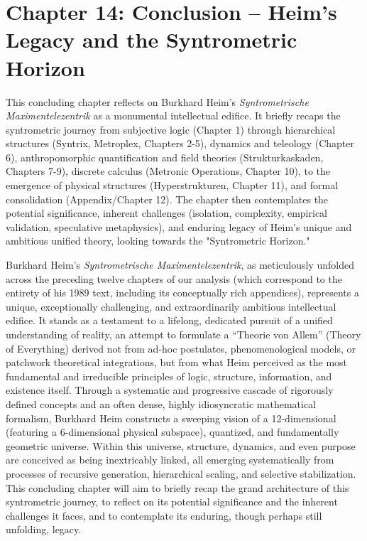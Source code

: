 \documentclass[12pt]{article}
\begin{document}
\section{Chapter 14: Conclusion – Heim’s Legacy and the Syntrometric Horizon}
\label{sec:conclusion}

This concluding chapter reflects on Burkhard Heim’s \textit{Syntrometrische Maximentelezentrik} as a monumental intellectual edifice. It briefly recaps the syntrometric journey from subjective logic (Chapter 1) through hierarchical structures (Syntrix, Metroplex, Chapters 2-5), dynamics and teleology (Chapter 6), anthropomorphic quantification and field theories (Strukturkaskaden, Chapters 7-9), discrete calculus (Metronic Operations, Chapter 10), to the emergence of physical structures (Hyperstrukturen, Chapter 11), and formal consolidation (Appendix/Chapter 12). The chapter then contemplates the potential significance, inherent challenges (isolation, complexity, empirical validation, speculative metaphysics), and enduring legacy of Heim's unique and ambitious unified theory, looking towards the "Syntrometric Horizon."

Burkhard Heim’s \textit{Syntrometrische Maximentelezentrik}, as meticulously unfolded across the preceding twelve chapters of our analysis (which correspond to the entirety of his 1989 text, including its conceptually rich appendices), represents a unique, exceptionally challenging, and extraordinarily ambitious intellectual edifice. It stands as a testament to a lifelong, dedicated pursuit of a unified understanding of reality, an attempt to formulate a \enquote{Theorie von Allem} (Theory of Everything) derived not from ad-hoc postulates, phenomenological models, or patchwork theoretical integrations, but from what Heim perceived as the most fundamental and irreducible principles of logic, structure, information, and existence itself. Through a systematic and progressive cascade of rigorously defined concepts and an often dense, highly idiosyncratic mathematical formalism, Burkhard Heim constructs a sweeping vision of a 12-dimensional (featuring a 6-dimensional physical subspace), quantized, and fundamentally geometric universe. Within this universe, structure, dynamics, and even purpose are conceived as being inextricably linked, all emerging systematically from processes of recursive generation, hierarchical scaling, and selective stabilization. This concluding chapter will aim to briefly recap the grand architecture of this syntrometric journey, to reflect on its potential significance and the inherent challenges it faces, and to contemplate its enduring, though perhaps still unfolding, legacy.
\end{document}
